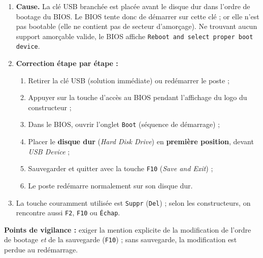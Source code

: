 \documentclass[11pt]{article}
\begin{document}
\begin{corrige}
\begin{enumerate}
\item \textbf{Cause.} La clé USB branchée est placée avant le disque dur dans l'ordre de bootage du BIOS. Le BIOS tente donc de démarrer sur cette clé ; or elle n'est pas bootable (elle ne contient pas de secteur d'amorçage). Ne trouvant aucun support amorçable valide, le BIOS affiche \texttt{Reboot and select proper boot device}.
\item \textbf{Correction étape par étape :}
\begin{enumerate}
\item Retirer la clé USB (solution immédiate) ou redémarrer le poste ;
\item Appuyer sur la touche d'accès au BIOS pendant l'affichage du logo du constructeur ;
\item Dans le BIOS, ouvrir l'onglet \texttt{Boot} (séquence de démarrage) ;
\item Placer le \textbf{disque dur} (\emph{Hard Disk Drive}) en \textbf{première position}, devant \emph{USB Device} ;
\item Sauvegarder et quitter avec la touche \texttt{F10} (\emph{Save and Exit}) ;
\item Le poste redémarre normalement sur son disque dur.
\end{enumerate}
\item La touche couramment utilisée est \texttt{Suppr} (\texttt{Del}) ; selon les constructeurs, on rencontre aussi \texttt{F2}, \texttt{F10} ou \texttt{Échap}.
\end{enumerate}
\textbf{Points de vigilance :} exiger la mention explicite de la modification de l'ordre de bootage \emph{et} de la sauvegarde (\texttt{F10}) ; sans sauvegarde, la modification est perdue au redémarrage.
\end{corrige}
\end{document}
